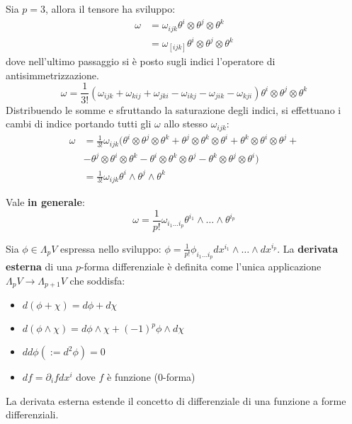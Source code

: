 \begin{esempio}
Sia $p=3$, allora il tensore ha sviluppo:
\begin{align*}
    \omega &= \omega_{ijk} \theta^i \otimes \theta^j \otimes \theta^k \\
    &= \omega_{[ijk]} \theta^i \otimes \theta^j \otimes \theta^k
\end{align*}
dove nell'ultimo passaggio si è posto sugli indici l'operatore di antisimmetrizzazione.
\begin{equation*}
    \omega = \frac{1}{3!}( \omega_{ijk} + \omega_{kij} + \omega_{jki} - \omega_{ikj} - \omega_{jik} - \omega_{kji} ) \theta^i \otimes \theta^j \otimes \theta^k
\end{equation*}
Distribuendo le somme e sfruttando la saturazione degli indici, si effettuano i cambi di indice portando tutti gli $\omega$ allo stesso $\omega_{ijk}$:
\begin{align*}
    \omega &= \frac{1}{3!}\omega_{ijk}(
       \theta^i \otimes \theta^j   \otimes \theta^k
    +   \theta^j \otimes \theta^k   \otimes \theta^i
    +   \theta^k \otimes \theta^i   \otimes \theta^j + \\
    &
    -   \theta^j \otimes \theta^i   \otimes \theta^k
    -   \theta^i \otimes \theta^k   \otimes \theta^j
    -   \theta^k \otimes \theta^j   \otimes \theta^i) \\
    &= \frac{1}{3!} \omega_{ijk} \theta^i \wedge \theta^j \wedge \theta^k
\end{align*}
\end{esempio}

Vale \textbf{in generale}:
\begin{equation*}
    \omega = \frac{1}{p!}\omega_{i_1 \dots i_p} \theta^{i_1} \wedge \dots \wedge \theta^{i_p}
\end{equation*}

\begin{definizione}
Sia $\phi \in \Lambda_p V$ espressa nello sviluppo: $\phi = \frac{1}{p!}\phi_{i_1 \dots i_p} dx^{i_1} \wedge \dots \wedge dx^{i_p}$. La \textbf{derivata esterna} di una $p$-forma differenziale è definita come l'unica applicazione $\Lambda_p V \rightarrow \Lambda_{p+1}V$ che soddisfa:
\begin{itemize}
    \item $d(\phi + \chi) = d\phi + d\chi$
    
    \item $d(\phi \wedge \chi)=d\phi \wedge \chi + (-1)^p\phi \wedge d\chi$
    
    \item $dd\phi (:= d^2\phi) = 0$
    
    \item $df = \partial_i f dx^i$ dove $f$ è funzione (0-forma)
\end{itemize}
\end{definizione}
La derivata esterna estende il concetto di differenziale di una funzione a forme differenziali.

